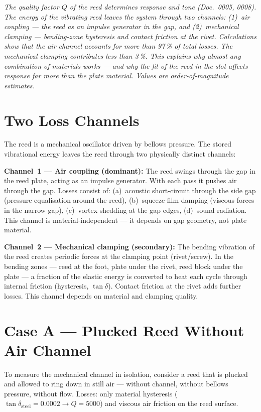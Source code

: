 \documentclass[11pt,a4paper]{article}
\begin{document}
\hbmaketitle

{\small\itshape The quality factor $Q$ of the reed determines response and tone (Doc.~0005, 0008). The energy of the vibrating reed leaves the system through two channels: (1)~air coupling --- the reed as an impulse generator in the gap, and (2)~mechanical clamping --- bending-zone hysteresis and contact friction at the rivet. Calculations show that the air channel accounts for more than 97\,\% of total losses. The mechanical clamping contributes less than 3\,\%. This explains why almost any combination of materials works --- and why the fit of the reed in the slot affects response far more than the plate material. Values are order-of-magnitude estimates.}

\vspace{4mm}

\section{Two Loss Channels}

The reed is a mechanical oscillator driven by bellows pressure. The stored vibrational energy leaves the reed through two physically distinct channels:

\textbf{Channel~1 --- Air coupling (dominant):} The reed swings through the gap in the reed plate, acting as an impulse generator. With each pass it pushes air through the gap. Losses consist of: (a)~acoustic short-circuit through the side gap (pressure equalisation around the reed), (b)~squeeze-film damping (viscous forces in the narrow gap), (c)~vortex shedding at the gap edges, (d)~sound radiation. This channel is material-independent --- it depends on gap geometry, not plate material.

\textbf{Channel~2 --- Mechanical clamping (secondary):} The bending vibration of the reed creates periodic forces at the clamping point (rivet/screw). In the bending zones --- reed at the foot, plate under the rivet, reed block under the plate --- a fraction of the elastic energy is converted to heat each cycle through internal friction (hysteresis, $\tan\delta$). Contact friction at the rivet adds further losses. This channel depends on material and clamping quality.

\section{Case A --- Plucked Reed Without Air Channel}

To measure the mechanical channel in isolation, consider a reed that is plucked and allowed to ring down in still air --- without channel, without bellows pressure, without flow. Losses: only material hysteresis ($\tan\delta_\text{steel} = 0{.}0002 \to Q = 5000$) and viscous air friction on the reed surface.
\end{document}
